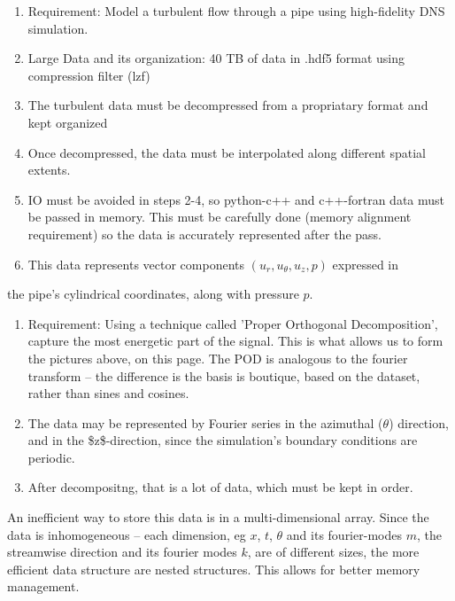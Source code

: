 \documentclass[11pt]{article}
\begin{document}
\begin{enumerate}
\item Requirement: Model a turbulent flow through a pipe using high-fidelity DNS simulation.
\item Large Data and its organization: 40 TB of data in .hdf5 format using compression filter (lzf)
\item The turbulent data must be decompressed from a propriatary format and kept organized
\item Once decompressed, the data must be interpolated along different spatial extents.
\item IO must be avoided in steps 2-4, so python-c++ and c++-fortran data must be passed in memory. This must be carefully done (memory alignment requirement) so the data is accurately represented after the pass.
\item This data represents vector components \((u_r,u_\theta,u_z,p)\) expressed in
\end{enumerate}
the pipe's cylindrical coordinates, along with pressure \(p\). 
\begin{enumerate}
\item Requirement: Using a technique called 'Proper Orthogonal Decomposition', capture the most energetic part of the signal. This is what allows us to form the pictures above, on this page. The POD is analogous to the fourier transform -- the difference is the basis is boutique, based on the dataset, rather than sines and cosines.
\item The data may be represented by Fourier series in the azimuthal (\(\theta\)) direction, and in the \$z\$-direction, since the simulation's boundary conditions are periodic.
\item After decompositng, that is a lot of data, which must be kept in order.
\end{enumerate}
An inefficient way to store this data is in a multi-dimensional array. Since the data is inhomogeneous -- each dimension, eg \(x\), \(t\), \(\theta\) and its fourier-modes \(m\), the streamwise direction and its fourier modes \(k\), are of different sizes, the more efficient data structure are nested structures. This allows for better memory management.
\end{document}
